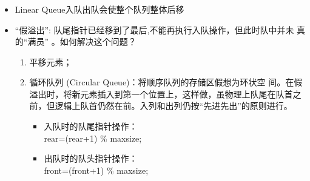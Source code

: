 \begin{frame}[fragile]
  \frametitle{}
  \begin{itemize}
  \item Linear Queue入队出队会使整个队列整体后移
  \item “假溢出”: 队尾指针已经移到了最后,不能再执行入队操作，但此时队中并未
    真的“满员” 。如何解决这个问题？
    \begin{enumerate}
    \item 平移元素；
    \item {\color{red}循环队列 (Circular Queue)：将顺序队列的存储区假想为环状空
      间。}在假溢出时，将新元素插入到第一个位置上，这样做，虽物理上队尾在队首之
      前，但逻辑上队首仍然在前。入列和出列仍按“先进先出”的原则进行。

      \begin{itemize}
      \item 入队时的队尾指针操作： \\
        rear=(rear+1) \% maxsize;
      \item 出队时的队头指针操作：\\
		    front=(front+1) \% maxsize;
      \end{itemize}
    \end{enumerate}
  \end{itemize}
\end{frame}

